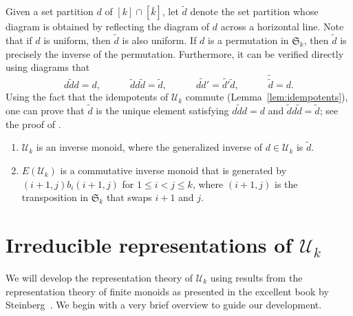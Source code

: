 Given a set partition $d$ of $[k] \cap [\bar{k}]$,
let $\widetilde{d}$ denote the set partition whose diagram is obtained by
reflecting the diagram of $d$ across a horizontal line.
Note that if $d$ is uniform, then $\widetilde{d}$ is also uniform.
If $d$ is a permutation in $\mathfrak{S}_k$,
then $\widetilde{d}$ is precisely the inverse of the permutation.
Furthermore, it can be verified directly using diagrams that
\begin{equation*}
    d\widetilde{d}d = d,
    \qquad\quad
    \widetilde{d}d\widetilde{d} = \widetilde{d},
    \qquad\quad
    \widetilde{dd'} = \widetilde{d'}\widetilde{d},
    \qquad\quad
    \tilde{\tilde{d}} = d.
\end{equation*}
Using the fact that the idempotents of $\mathcal{U}_k$ commute
(Lemma~\ref{lem:idempotents}), one can prove that $\widetilde{d}$ is the unique
element satisfying
$d\widetilde{d}d = d$ and $\widetilde{d}d\widetilde{d} = \widetilde{d}$;
see the proof of \cite[Theorem~3.2]{Steinberg.2016}.
\begin{prop} \leavevmode
    \begin{enumerate}
        \item
            $\mathcal{U}_k$ is an inverse monoid,
            where the generalized inverse of $d \in \mathcal{U}_k$ is $\widetilde{d}$.

        \item
            $E(\mathcal{U}_k)$ is a commutative inverse monoid
            that is generated by
            $(i+1,j) b_i (i+1,j)$ for $1\leqslant i < j \leqslant k$,
            where $(i+1,j)$ is the transposition in $\mathfrak{S}_k$ that swaps $i+1$ and $j$.
    \end{enumerate}
\end{prop}

\section{Irreducible representations of $\mathcal{U}_k$}
\label{section.irreps of Uk}

We will develop the representation theory of $\mathcal{U}_k$
using results from the representation theory of finite monoids
as presented in the excellent book by Steinberg~\cite{Steinberg.2016}.
We begin with a very brief overview to guide our development.

